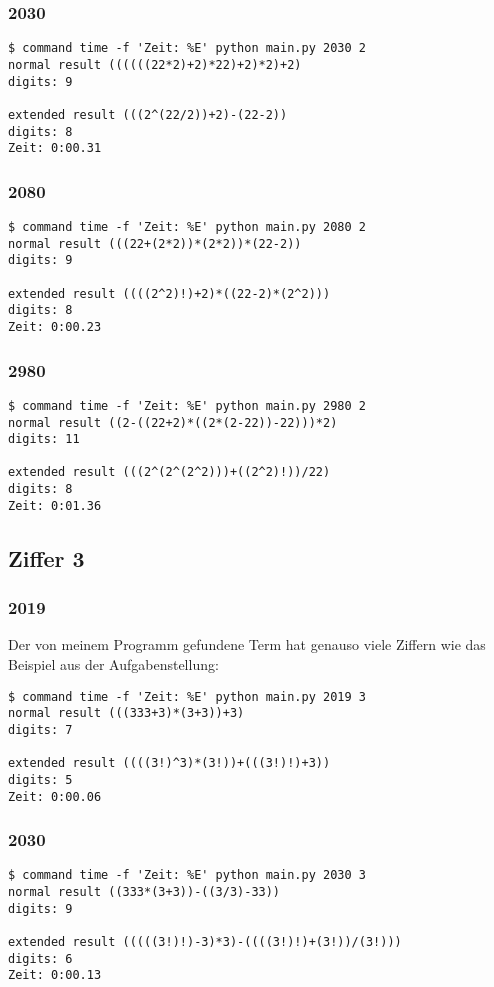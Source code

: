 \subsubsection{2030}
\begin{lstlisting}
$ command time -f 'Zeit: %E' python main.py 2030 2
normal result ((((((22*2)+2)*22)+2)*2)+2)
digits: 9

extended result (((2^(22/2))+2)-(22-2))
digits: 8
Zeit: 0:00.31
\end{lstlisting}
\subsubsection{2080}
\begin{lstlisting}
$ command time -f 'Zeit: %E' python main.py 2080 2
normal result (((22+(2*2))*(2*2))*(22-2))
digits: 9

extended result ((((2^2)!)+2)*((22-2)*(2^2)))
digits: 8
Zeit: 0:00.23
\end{lstlisting}
\subsubsection{2980}
\begin{lstlisting}
$ command time -f 'Zeit: %E' python main.py 2980 2
normal result ((2-((22+2)*((2*(2-22))-22)))*2)
digits: 11

extended result (((2^(2^(2^2)))+((2^2)!))/22)
digits: 8
Zeit: 0:01.36
\end{lstlisting}
\subsection{Ziffer 3}
\subsubsection{2019}
Der von meinem Programm gefundene Term hat genauso viele Ziffern wie das Beispiel aus der Aufgabenstellung:
\begin{lstlisting}
$ command time -f 'Zeit: %E' python main.py 2019 3
normal result (((333+3)*(3+3))+3)
digits: 7

extended result ((((3!)^3)*(3!))+(((3!)!)+3))
digits: 5
Zeit: 0:00.06
\end{lstlisting}
\subsubsection{2030}
\begin{lstlisting}
$ command time -f 'Zeit: %E' python main.py 2030 3
normal result ((333*(3+3))-((3/3)-33))
digits: 9

extended result (((((3!)!)-3)*3)-((((3!)!)+(3!))/(3!)))
digits: 6
Zeit: 0:00.13
\end{lstlisting}
